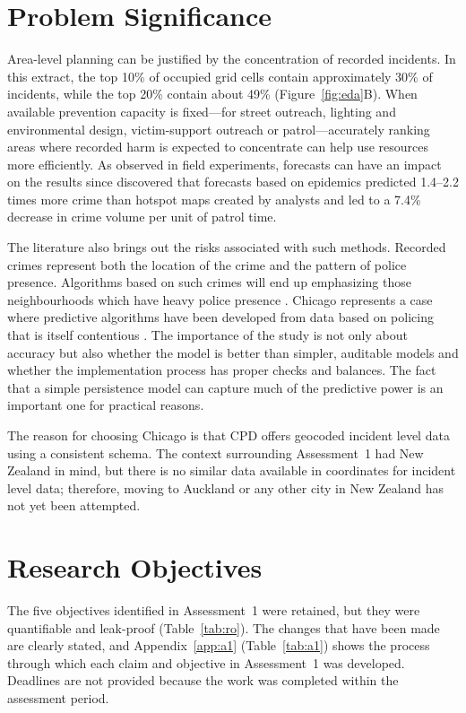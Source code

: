 \documentclass[11pt,a4paper]{report}
\begin{document}
\section{Problem Significance}
Area-level planning can be justified by the concentration of recorded incidents. In this extract, the top 10\% of occupied grid cells contain approximately 30\% of incidents, while the top 20\% contain about 49\% (Figure~\ref{fig:eda}B). When available prevention capacity is fixed---for street outreach, lighting and environmental design, victim-support outreach or patrol---accurately ranking areas where recorded harm is expected to concentrate can help use resources more efficiently. As observed in field experiments, forecasts can have an impact on the results since \citet{mohler2015} discovered that forecasts based on epidemics predicted 1.4--2.2 times more crime than hotspot maps created by analysts and led to a 7.4\% decrease in crime volume per unit of patrol time.

The literature also brings out the risks associated with such methods. Recorded crimes represent both the location of the crime and the pattern of police presence. Algorithms based on such crimes will end up emphasizing those neighbourhoods which have heavy police presence \citep{lum2016,ensign2018}. Chicago represents a case where predictive algorithms have been developed from data based on policing that is itself contentious \citep{richardson2019}. The importance of the study is not only about accuracy but also whether the model is better than simpler, auditable models and whether the implementation process has proper checks and balances. The fact that a simple persistence model can capture much of the predictive power is an important one for practical reasons.

The reason for choosing Chicago is that CPD offers geocoded incident level data using a consistent schema. The context surrounding Assessment~1 had New Zealand in mind, but there is no similar data available in coordinates for incident level data; therefore, moving to Auckland or any other city in New Zealand has not yet been attempted.

\section{Research Objectives}
The five objectives identified in Assessment~1 were retained, but they were quantifiable and leak-proof (Table~\ref{tab:ro}). The changes that have been made are clearly stated, and Appendix~\ref{app:a1} (Table~\ref{tab:a1}) shows the process through which each claim and objective in Assessment~1 was developed. Deadlines are not provided because the work was completed within the assessment period.
\end{document}
